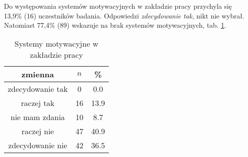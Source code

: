 

 Do występowania systemów motywacyjnych w zakładzie pracy przychyla się 13,9\% (16) uczestników badania. Odpowiedzi  \textit{zdecydowanie tak},  nikt nie wybrał. Natomiast 77,4\% (89) wskazuje na brak systemów motywacyjnych, tab. \ref{tab:Q9}.

\begin{table}[H]
\caption{Systemy motywacyjne w zakładzie pracy}
\centering
\begin{tabular}{ | c | c | c |}
\hline
zmienna & $n$ & \% \\
\hline
zdecydowanie tak  &  0  & 0.0\\
\hline
raczej tak  &  16  & 13.9 \\
\hline
nie mam zdania  &  10  & 8.7 \\
\hline
raczej nie  &  47  & 40.9 \\
\hline
zdecydowanie nie  &  42  & 36.5 \\
\hline
\end{tabular}
\label{tab:Q9}
\end{table}

